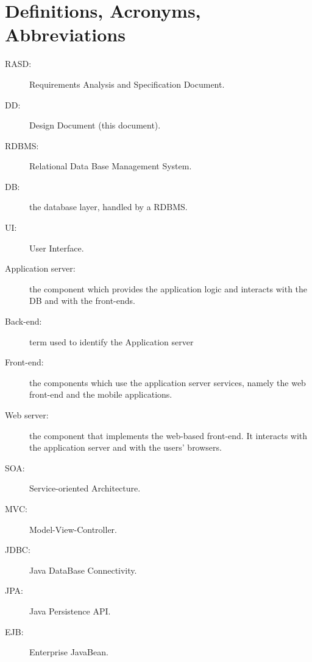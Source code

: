 \section{Definitions, Acronyms, Abbreviations}
\label{sec:definitions}

\begin{description}
\item[RASD:] Requirements Analysis and Specification Document.
\item[DD:] Design Document (this document).
\item[RDBMS:] Relational Data Base Management System.
\item[DB:] the database layer, handled by a RDBMS.
\item[UI:] User Interface.
\item[Application server:] the component which provides the application logic and interacts with the DB and with the front-ends.
\item[Back-end:] term used to identify the Application server
\item[Front-end:] the components which use the application server services, namely the web front-end and the mobile applications.
\item[Web server:] the component that implements the web-based front-end. It interacts with the application server and with the users' browsers.
\item[SOA:] Service-oriented Architecture.
\item[MVC:] Model-View-Controller.
\item[JDBC:] Java DataBase Connectivity.
\item[JPA:] Java Persistence API.
\item[EJB:] Enterprise JavaBean.
\end{description}

